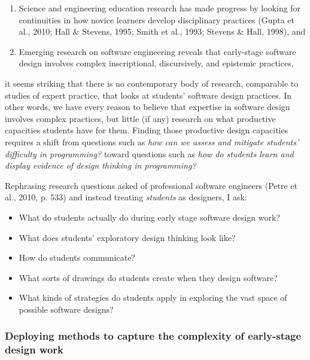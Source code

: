 \begin{enumerate}
\def\labelenumi{\arabic{enumi}.}
\item
  Science and engineering education research has made progress by
  looking for continuities in how novice learners develop disciplinary
  practices (Gupta et al., 2010; Hall \& Stevens, 1995; Smith et al.,
  1993; Stevens \& Hall, 1998), and
\item
  Emerging research on software engineering reveals that early-stage
  software design involves complex inscriptional, discursively, and
  epistemic practices,
\end{enumerate}

it seems striking that there is no contemporary body of research,
comparable to studies of expert practice, that looks at students'
software design practices. In other words, we have every reason to
believe that expertise in software design involves complex practices,
but little (if any) research on what productive capacities students have
for them. Finding those productive design capacities requires a shift
from questions such as \emph{how can we assess and mitigate students'
difficulty in programming?} toward questions such as \emph{how do
students learn and display evidence of design thinking in programming?}

Rephrasing research questions asked of professional software engineers
(Petre et al., 2010, p. 533) and instead treating \emph{students} as
designers, I ask:

\begin{itemize}
\item
  What do students actually do during early stage software design work?
\item
  What does students' exploratory design thinking look like?
\item
  How do students communicate?
\item
  What sorts of drawings do students create when they design software?
\item
  What kinds of strategies do students apply in exploring the vast space
  of possible software designs?
\end{itemize}

\subsubsection{Deploying methods to capture the complexity of
early-stage design
work}\label{deploying-methods-to-capture-the-complexity-of-early-stage-design-work}

